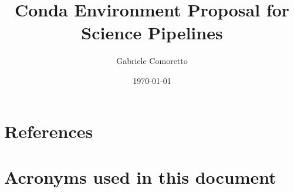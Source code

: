 \documentclass[DM,authoryear,toc,lsstdraft]{lsstdoc}
\title{Conda Environment Proposal for Science Pipelines}
\author{%
Gabriele Comoretto
}
\date{\today}
\begin{document}
\setDocUpstreamVersion{\vcsrevision}
\maketitle




\newpage
\appendix

\section{References} \label{sec:bib}



\section{Acronyms used in this document}\label{sec:acronyms}

\end{document}
